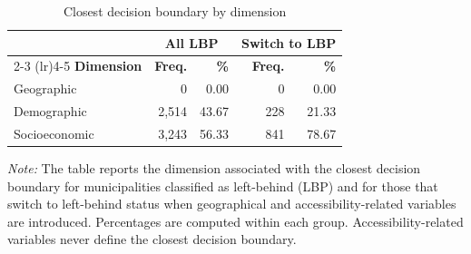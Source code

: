 \documentclass[a4paper,11pt,oneside]{article}
\begin{document}
\clearpage
\pagebreak

\begin{table}[!ht]
\centering
\caption{Closest decision boundary by dimension}
\label{tab:threshold_dimension}
\footnotesize
\begin{tabular}{lrrrr}
\toprule
 & \multicolumn{2}{c}{\textbf{All LBP}} & \multicolumn{2}{c}{\textbf{Switch to LBP}} \\
\cmidrule(lr){2-3} \cmidrule(lr){4-5}
\textbf{Dimension} & \textbf{Freq.} & \textbf{\%} & \textbf{Freq.} & \textbf{\%} \\
\midrule
Geographic & 0    & 0.00  & 0   & 0.00  \\
Demographic   & 2,514 & 43.67 & 228 & 21.33 \\
Socioeconomic & 3,243 & 56.33 & 841 & 78.67 \\
\bottomrule
\end{tabular}

\vspace{0.2cm}
\begin{minipage}{0.9\linewidth}
\footnotesize
\textit{Note:} The table reports the dimension associated with the closest decision boundary for municipalities classified as left-behind (LBP) and for those that switch to left-behind status when geographical and accessibility-related variables are introduced. Percentages are computed within each group. Accessibility-related variables never define the closest decision boundary.
\end{minipage}
\end{table}
\end{document}
